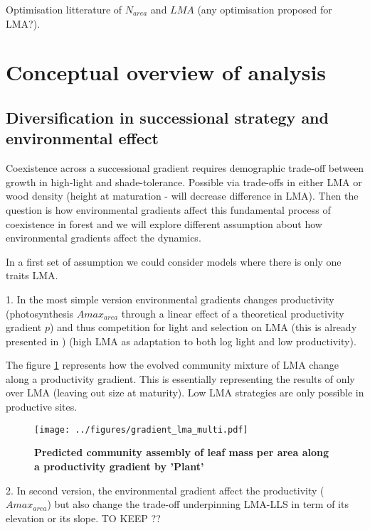 \documentclass[a4paper,11pt]{article}
\begin{document}
Optimisation litterature of $N_{area}$ and $LMA$ (any optimisation proposed for LMA?).



\section{Conceptual overview of analysis}

\subsection{Diversification in successional strategy and environmental effect}

Coexistence across a successional gradient requires demographic trade-off between growth in high-light and shade-tolerance. Possible via trade-offs in either LMA or wood density (height at maturation - will decrease difference in LMA). Then the question is how environmental gradients affect this fundamental process of coexistence in forest and we will explore different assumption about how environmental gradients
affect the dynamics.

In a first set of assumption we could consider models where there is only one traits LMA.

\clearpage

1. In the most simple version environmental gradients changes productivity (photosynthesis $A{max}_{area}$ through a linear effect of a theoretical productivity gradient $p$) and
thus competition for light and selection on LMA (this is already presented in \citet{Falster-2017}) (high LMA as adaptation to both log light and low productivity).

The figure \ref{fig:lma} represents how the evolved community mixture of LMA change along a productivity gradient. This is essentially representing the results of \citet{Falster-2017} only over LMA (leaving out size at maturity). Low LMA strategies are only possible in productive sites.

\begin{figure}[ht]
\centering
\texttt{[image: ../figures/gradient\_lma\_multi.pdf]}
\caption{\textbf{Predicted community assembly of leaf mass per area along a productivity gradient by 'Plant' \citep[see][]{Falster-2016}}
\label{fig:lma}}
\end{figure}

\clearpage

2. In second version, the environmental gradient affect the productivity ($A{max}_{area}$) but also change the trade-off underpinning LMA-LLS in term of its elevation or its slope. TO KEEP ??
\end{document}
